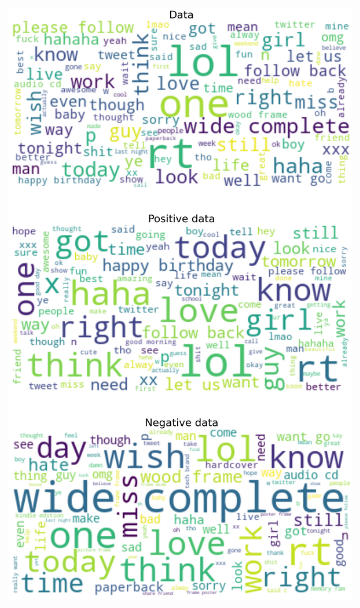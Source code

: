 \documentclass{article}
\begin{document}
\begin{itemize}
\begin{figure}[H]
\begin{subfigure}[b]{0.24\textwidth}
    \includegraphics[width=\textwidth]{chapter-06/section-01-01/15/visualization/3/wordcloud.png}
    \end{subfigure}
    \begin{subfigure}[b]{0.24\textwidth}
      \centering

\end{subfigure}
\end{figure}
\end{itemize}
\end{document}
